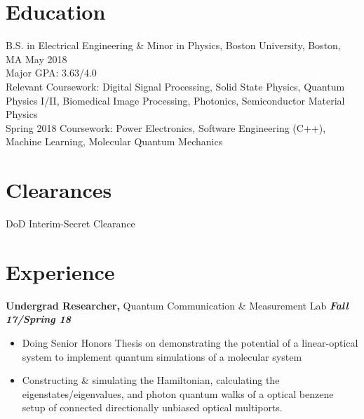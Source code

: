 \documentclass[margin]{res}
\begin{document}
 
 
\address{{\bf Present Address} \\ 39 Buswell St Apt 08 \\ Boston, MA 02215  \\
        (781) 664-7151 \\ Linkedin - www.linkedin.com/in/sonam-ghosh-a6ab09100 }
        
\address{{\bf Permanent Address} \\ 9350 Double R Blvd Apt 3814 \\ Reno, NV 89521 \\
        sonamg@bu.edu }


\begin{resume} 
 

\section{Education} 
B.S. in Electrical Engineering \& Minor in Physics, Boston University, Boston, MA \hfill May 2018 \\
Major GPA: 3.63/4.0 \\
Relevant Coursework: Digital Signal Processing, Solid State Physics, Quantum Physics I/II, Biomedical Image Processing, Photonics, Semiconductor Material Physics \\
Spring 2018 Coursework: Power Electronics, Software Engineering (C++), Machine Learning, Molecular Quantum Mechanics 
 
\section{Clearances}
DoD Interim-Secret Clearance 

\section{Experience}
{\bf Undergrad Researcher,} Quantum Communication \& Measurement Lab \hfill  \textbf{\textit{Fall 17/Spring 18}}
\begin{itemize}  pt
\item Doing Senior Honors Thesis on demonstrating the potential of a linear-optical system to implement quantum simulations of a molecular system
\item Constructing \& simulating the Hamiltonian, calculating the eigenstates/eigenvalues, and photon quantum walks of a optical benzene setup of connected directionally unbiased optical multiports.
\end{itemize}




\end{resume}
\end{document}
